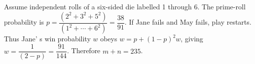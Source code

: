 Assume independent rolls of a six-sided die labelled 1 through 6. The prime-roll probability is $p=\dfrac{(2^2+3^2+5^2)}{(1^2+\cdots+6^2)}=\dfrac{38}{91}$. If Jane fails and May fails, play restarts. Thus Jane' s win probability $w$ obeys $w=p+(1-p)^2w$, giving $w=\dfrac{1}{(2-p)}=\dfrac{91}{144}$. Therefore $\boxed{m+n=235}$.
